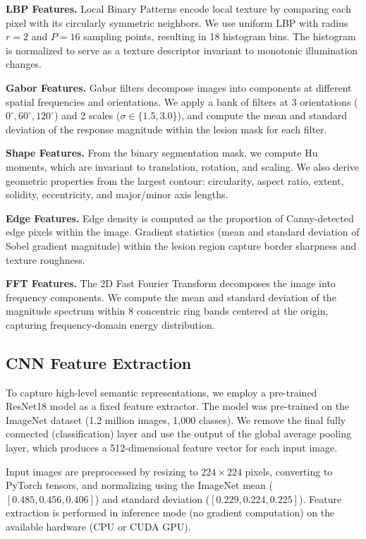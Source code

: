 \documentclass[conference]{IEEEtran}
\begin{document}
\textbf{LBP Features.} Local Binary Patterns encode local texture by
comparing each pixel with its circularly symmetric neighbors. We use
uniform LBP with radius $r=2$ and $P=16$ sampling points, resulting
in 18 histogram bins. The histogram is normalized to serve as a
texture descriptor invariant to monotonic illumination changes.

\textbf{Gabor Features.} Gabor filters decompose images into
components at different spatial frequencies and orientations. We
apply a bank of filters at 3 orientations ($0^\circ, 60^\circ,
120^\circ$) and 2 scales ($\sigma \in \{1.5, 3.0\}$), and compute
the mean and standard deviation of the response magnitude within the
lesion mask for each filter.

\textbf{Shape Features.} From the binary segmentation mask, we
compute Hu moments, which are invariant to translation, rotation,
and scaling. We also derive geometric properties from the largest
contour: circularity, aspect ratio, extent, solidity, eccentricity,
and major/minor axis lengths.

\textbf{Edge Features.} Edge density is computed as the proportion
of Canny-detected edge pixels within the image. Gradient statistics
(mean and standard deviation of Sobel gradient magnitude) within the
lesion region capture border sharpness and texture roughness.

\textbf{FFT Features.} The 2D Fast Fourier Transform decomposes the
image into frequency components. We compute the mean and standard
deviation of the magnitude spectrum within 8 concentric ring bands
centered at the origin, capturing frequency-domain energy
distribution.

\subsection{CNN Feature Extraction}

To capture high-level semantic representations, we employ a
pre-trained ResNet18 model \cite{he2016deep} as a fixed feature
extractor. The model was pre-trained on the ImageNet dataset
(1.2 million images, 1,000 classes). We remove the final fully
connected (classification) layer and use the output of the global
average pooling layer, which produces a 512-dimensional feature
vector for each input image.

Input images are preprocessed by resizing to $224 \times 224$ pixels,
converting to PyTorch tensors, and normalizing using the ImageNet
mean ($[0.485, 0.456, 0.406]$) and standard deviation
($[0.229, 0.224, 0.225]$). Feature extraction is performed in
inference mode (no gradient computation) on the available hardware
(CPU or CUDA GPU).
\end{document}
